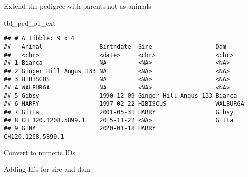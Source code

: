 \documentclass[
]{article}
\newenvironment{Shaded}{\begin{snugshade}}{\end{snugshade}}
\newcommand{\DecValTok}[1]{\textcolor[rgb]{0.00,0.00,0.81}{#1}}
\newcommand{\FunctionTok}[1]{\textcolor[rgb]{0.00,0.00,0.00}{#1}}
\newcommand{\NormalTok}[1]{#1}
\newcommand{\OtherTok}[1]{\textcolor[rgb]{0.56,0.35,0.01}{#1}}
\newcommand{\SpecialCharTok}[1]{\textcolor[rgb]{0.00,0.00,0.00}{#1}}
\newcommand{\StringTok}[1]{\textcolor[rgb]{0.31,0.60,0.02}{#1}}
\begin{document}
Extend the pedigree with parents not as animals

\begin{Shaded}
\begin{Highlighting}[]
\NormalTok{tbl\_ped\_p1\_ext}
\end{Highlighting}
\end{Shaded}

\begin{verbatim}
## # A tibble: 9 x 4
##   Animal                Birthdate  Sire                  Dam              
##   <chr>                 <date>     <chr>                 <chr>            
## 1 Bianca                NA         <NA>                  <NA>             
## 2 Ginger Hill Angus 133 NA         <NA>                  <NA>             
## 3 HIBISCUS              NA         <NA>                  <NA>             
## 4 WALBURGA              NA         <NA>                  <NA>             
## 5 Gibsy                 1990-12-09 Ginger Hill Angus 133 Bianca           
## 6 HARRY                 1997-02-22 HIBISCUS              WALBURGA         
## 7 Gitta                 2001-05-31 HARRY                 Gibsy            
## 8 CH 120.1208.5899.1    2015-11-22 <NA>                  Gitta            
## 9 GINA                  2020-01-18 HARRY                 CH120.1208.5899.1
\end{verbatim}

Convert to numeric IDs

\begin{Shaded}
\end{Shaded}

Adding IDs for sire and dam
\end{document}
